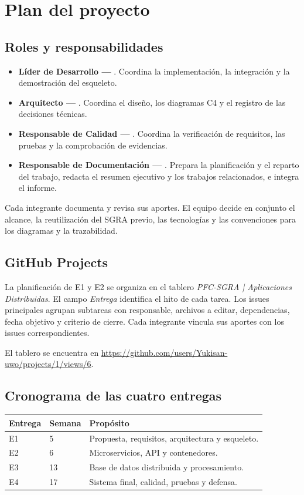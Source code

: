 \section{Plan del proyecto}
\subsection{Roles y responsabilidades}
\begin{itemize}
  \item \textbf{Líder de Desarrollo —} \liderdesarrollo. Coordina la implementación, la integración y la demostración del esqueleto.
  \item \textbf{Arquitecto —} \arquitecto. Coordina el diseño, los diagramas C4 y el registro de las decisiones técnicas.
  \item \textbf{Responsable de Calidad —} \responsablecalidad. Coordina la verificación de requisitos, las pruebas y la comprobación de evidencias.
  \item \textbf{Responsable de Documentación —} \responsabledocumentacion. Prepara la planificación y el reparto del trabajo, redacta el resumen ejecutivo y los trabajos relacionados, e integra el informe.
\end{itemize}
Cada integrante documenta y revisa sus aportes. El equipo decide en conjunto el alcance, la reutilización del SGRA previo, las tecnologías y las convenciones para los diagramas y la trazabilidad.

\subsection{GitHub Projects}
La planificación de E1 y E2 se organiza en el tablero \textit{PFC-SGRA | Aplicaciones Distribuidas}. El campo \textit{Entrega} identifica el hito de cada tarea. Los issues principales agrupan subtareas con responsable, archivos a editar, dependencias, fecha objetivo y criterio de cierre. Cada integrante vincula sus aportes con los issues correspondientes.

El tablero se encuentra en \url{https://github.com/users/Yukisan-uwo/projects/1/views/6}.
\subsection{Cronograma de las cuatro entregas}
\noindent\begin{tabularx}{\textwidth}{@{}p{}p{}X@{}}
\toprule\textbf{Entrega}&\textbf{Semana}&\textbf{Propósito}\\\midrule
E1 & 5 & Propuesta, requisitos, arquitectura y esqueleto.\\
E2 & 6 & Microservicios, API y contenedores.\\
E3 & 13 & Base de datos distribuida y procesamiento.\\
E4 & 17 & Sistema final, calidad, pruebas y defensa.\\
\bottomrule
\end{tabularx}

